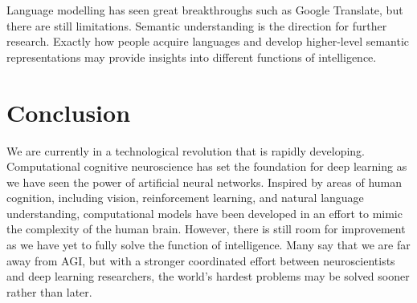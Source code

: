 \documentclass[12pt]{article}
\begin{document}
Language modelling has seen great breakthroughs such as Google Translate, but there are still limitations. Semantic understanding is the direction for further research. Exactly how people acquire languages and develop higher-level semantic representations may provide insights into different functions of intelligence.

\section{Conclusion}
We are currently in a technological revolution that is rapidly developing. Computational cognitive neuroscience has set the foundation for deep learning as we have seen the power of artificial neural networks. Inspired by areas of human cognition, including vision, reinforcement learning, and natural language understanding, computational models have been developed in an effort to mimic the complexity of the human brain. However, there is still room for improvement as we have yet to fully solve the function of intelligence. Many say that we are far away from AGI, but with a stronger coordinated effort between neuroscientists and deep learning researchers, the world’s hardest problems may be solved sooner rather than later.
\end{document}
